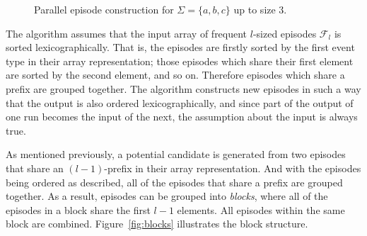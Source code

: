 \begin{figure}

\caption{Parallel episode construction for $ \Sigma = \{ a, b, c \} $ up to size 3.}

\label{fig:parallel-episode-lattice}
\end{figure}

The algorithm assumes that the input array of frequent $ l $-sized episodes $ \mathcal{F}_l $ is sorted lexicographically. That is, the episodes are firstly sorted by the first event type in their array representation; those episodes which share their first element are sorted by the second element, and so on. Therefore episodes which share a prefix are grouped together. The algorithm constructs new episodes in such a way that the output is also ordered lexicographically, and since part of the output of one run becomes the input of the next, the assumption about the input is always true.

As mentioned previously, a potential candidate is generated from two episodes that share an $ (l - 1) $-prefix in their array representation. And with the episodes being ordered as described, all of the episodes that share a prefix are grouped together. As a result, episodes can be grouped into \emph{blocks}, where all of the episodes in a block share the first $ l - 1 $ elements. All episodes within the same block are combined. Figure~\ref{fig:blocks} illustrates the block structure.

\newcommand\blockspicvalue[2]{
    \ifcase#2
        \ifcase#1 a
            \or a
            \or b
        \fi
        \or \ifcase#1 a
            \or a
            \or c
        \fi
        \or \ifcase#1 a
            \or c
            \or c
        \fi
        \or \ifcase#1 a
            \or c
            \or d
        \fi
        \or b
        \or \ifcase#1 b
            \or b
            \or c
        \fi
        \or \ifcase#1 b
            \or b
            \or d
        \fi
        \or c
    \fi
}

